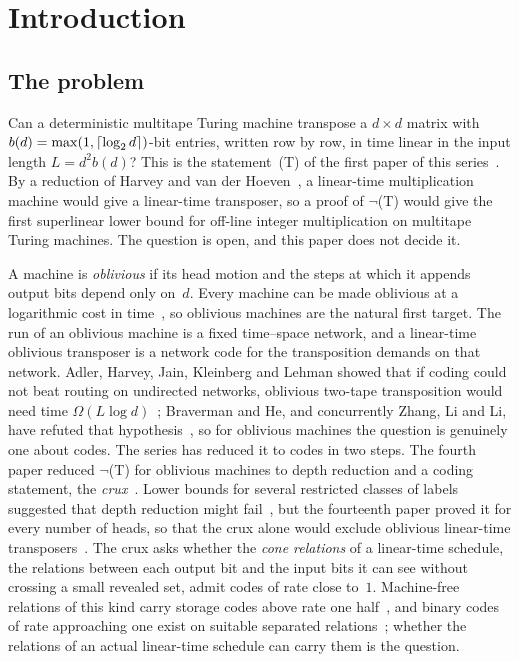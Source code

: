 \section{Introduction}\label{sec:intro}

\subsection{The problem}

Can a deterministic multitape Turing machine transpose a $d\times d$ matrix with $b(d)=\max(1,\lceil \log_2 d \rceil)$-bit entries, written
row by row, in time linear in the input length $L=d^2b(d)$? This is the statement~(T) of the first paper of this
series~\cite{FirstPaper2026}. By a reduction of Harvey and van der Hoeven~\cite[Cor.~6.9]{HvdH2025}, a linear-time
multiplication machine would give a linear-time transposer, so a proof of $\neg$(T) would give the first superlinear lower
bound for off-line integer multiplication on multitape Turing machines. The question is open, and this paper does not decide
it.

A machine is \emph{oblivious} if its head motion and the steps at which it appends output bits depend only on~$d$. Every machine can
be made oblivious at a logarithmic cost in time~\cite{PippengerFischer1979}, so oblivious machines are the natural first target. The
run of an oblivious machine is a fixed time--space network, and a linear-time oblivious transposer is a network code for the
transposition demands on that network. Adler, Harvey, Jain, Kleinberg and Lehman showed that if coding could not beat routing on
undirected networks, oblivious two-tape transposition would need time $\Omega(L\log d)$~\cite[\S6]{AHJKL2006}; Braverman and He, and
concurrently Zhang, Li and Li, have refuted that hypothesis~\cite{BravermanHe2026,ZhangLiLi2026}, so for oblivious machines the question
is genuinely one about codes. The series has reduced it to codes in two steps. The fourth paper reduced $\neg$(T) for oblivious machines
to depth reduction and a coding statement, the \emph{crux}~\cite[Theorem~D]{FourthPaper2026}. Lower bounds for several restricted
classes of labels suggested that depth reduction might fail~\cite{FourthPaper2026,EighthPaper2026,DirectedReciprocity2026,MergeDepth2026},
but the fourteenth paper proved it for every number of heads, so that the crux alone would exclude oblivious linear-time
transposers~\cite[Corollary~O]{BoundedStack2026}. The crux asks whether the \emph{cone relations} of a linear-time schedule, the
relations between each output bit and the input bits it can see without crossing a small revealed set, admit codes of rate close to~$1$.
Machine-free relations of this kind carry storage codes above rate one half~\cite{StorageCodes2026}, and binary codes of rate approaching
one exist on suitable separated relations~\cite{HighRate2026}; whether the relations of an actual linear-time schedule can carry them is
the question.

